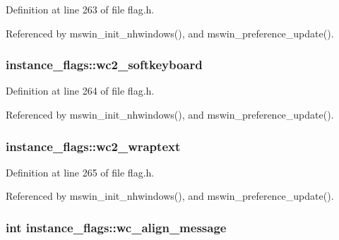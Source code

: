 Definition at line 263 of file flag.\+h.



Referenced by mswin\+\_\+init\+\_\+nhwindows(), and mswin\+\_\+preference\+\_\+update().

\hypertarget{structinstance__flags_ad2bead45f3c69306cd123eaa8d1b296f}{
\subsubsection[{wc2\+\_\+softkeyboard}]{ instance\+\_\+flags\+::wc2\+\_\+softkeyboard}}\label{structinstance__flags_ad2bead45f3c69306cd123eaa8d1b296f}


Definition at line 264 of file flag.\+h.



Referenced by mswin\+\_\+init\+\_\+nhwindows(), and mswin\+\_\+preference\+\_\+update().

\hypertarget{structinstance__flags_a30ed864bd7a69483c6ca4eefbcf628b5}{
\subsubsection[{wc2\+\_\+wraptext}]{ instance\+\_\+flags\+::wc2\+\_\+wraptext}}\label{structinstance__flags_a30ed864bd7a69483c6ca4eefbcf628b5}


Definition at line 265 of file flag.\+h.



Referenced by mswin\+\_\+init\+\_\+nhwindows(), and mswin\+\_\+preference\+\_\+update().

\hypertarget{structinstance__flags_a1072207cf89377c1bf7a1891be5f66da}{
\subsubsection[{wc\+\_\+align\+\_\+message}]{\setlength{\rightskip}{0pt plus 5cm}int instance\+\_\+flags\+::wc\+\_\+align\+\_\+message}}\label{structinstance__flags_a1072207cf89377c1bf7a1891be5f66da}



